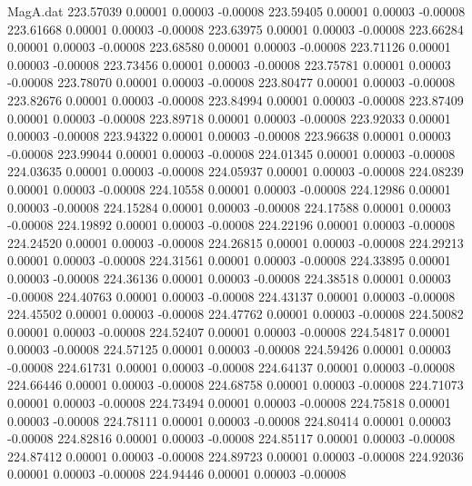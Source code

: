 \begin{filecontents}{MagA.dat}
 223.57039    0.00001    0.00003   -0.00008
 223.59405    0.00001    0.00003   -0.00008
 223.61668    0.00001    0.00003   -0.00008
 223.63975    0.00001    0.00003   -0.00008
 223.66284    0.00001    0.00003   -0.00008
 223.68580    0.00001    0.00003   -0.00008
 223.71126    0.00001    0.00003   -0.00008
 223.73456    0.00001    0.00003   -0.00008
 223.75781    0.00001    0.00003   -0.00008
 223.78070    0.00001    0.00003   -0.00008
 223.80477    0.00001    0.00003   -0.00008
 223.82676    0.00001    0.00003   -0.00008
 223.84994    0.00001    0.00003   -0.00008
 223.87409    0.00001    0.00003   -0.00008
 223.89718    0.00001    0.00003   -0.00008
 223.92033    0.00001    0.00003   -0.00008
 223.94322    0.00001    0.00003   -0.00008
 223.96638    0.00001    0.00003   -0.00008
 223.99044    0.00001    0.00003   -0.00008
 224.01345    0.00001    0.00003   -0.00008
 224.03635    0.00001    0.00003   -0.00008
 224.05937    0.00001    0.00003   -0.00008
 224.08239    0.00001    0.00003   -0.00008
 224.10558    0.00001    0.00003   -0.00008
 224.12986    0.00001    0.00003   -0.00008
 224.15284    0.00001    0.00003   -0.00008
 224.17588    0.00001    0.00003   -0.00008
 224.19892    0.00001    0.00003   -0.00008
 224.22196    0.00001    0.00003   -0.00008
 224.24520    0.00001    0.00003   -0.00008
 224.26815    0.00001    0.00003   -0.00008
 224.29213    0.00001    0.00003   -0.00008
 224.31561    0.00001    0.00003   -0.00008
 224.33895    0.00001    0.00003   -0.00008
 224.36136    0.00001    0.00003   -0.00008
 224.38518    0.00001    0.00003   -0.00008
 224.40763    0.00001    0.00003   -0.00008
 224.43137    0.00001    0.00003   -0.00008
 224.45502    0.00001    0.00003   -0.00008
 224.47762    0.00001    0.00003   -0.00008
 224.50082    0.00001    0.00003   -0.00008
 224.52407    0.00001    0.00003   -0.00008
 224.54817    0.00001    0.00003   -0.00008
 224.57125    0.00001    0.00003   -0.00008
 224.59426    0.00001    0.00003   -0.00008
 224.61731    0.00001    0.00003   -0.00008
 224.64137    0.00001    0.00003   -0.00008
 224.66446    0.00001    0.00003   -0.00008
 224.68758    0.00001    0.00003   -0.00008
 224.71073    0.00001    0.00003   -0.00008
 224.73494    0.00001    0.00003   -0.00008
 224.75818    0.00001    0.00003   -0.00008
 224.78111    0.00001    0.00003   -0.00008
 224.80414    0.00001    0.00003   -0.00008
 224.82816    0.00001    0.00003   -0.00008
 224.85117    0.00001    0.00003   -0.00008
 224.87412    0.00001    0.00003   -0.00008
 224.89723    0.00001    0.00003   -0.00008
 224.92036    0.00001    0.00003   -0.00008
 224.94446    0.00001    0.00003   -0.00008

\end{filecontents}
